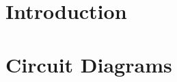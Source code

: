 %
\renewcommand{\baselinestretch}{1.5}

\parindent 0pt
\setlength{\parskip}{3ex}


\tableofcontents
\chapter{Introduction}



\newpage













\appendix






\chapter{Circuit Diagrams}

